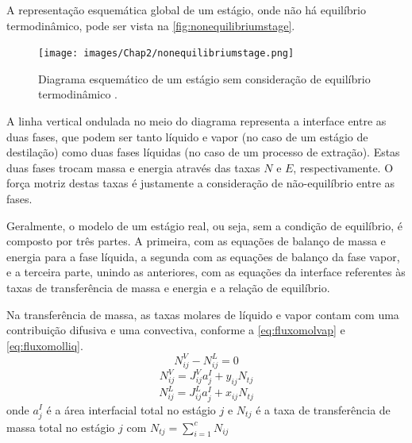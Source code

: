 \begin{enumerate}
A representação esquemática global de um estágio, onde não há equilíbrio termodinâmico, pode ser vista na
\autoref{fig:nonequilibriumstage}.
 \begin{figure}[htb]
 \centering \texttt{[image: images/Chap2/nonequilibriumstage.png]}
 \caption{Diagrama esquemático de um estágio sem consideração de equilíbrio termodinâmico \cite{Kooijman:1995a}.}
 \label{fig:nonequilibriumstage}
 \end{figure}
A linha vertical ondulada no meio do diagrama representa a interface entre as duas fases, que podem ser tanto líquido e
vapor (no caso de um estágio de destilação) como duas fases líquidas (no caso de
um processo de extração). Estas duas fases trocam massa e energia através das
taxas $N$ e $E$, respectivamente. O força motriz destas taxas é justamente a
consideração de não-equilíbrio entre as fases.

Geralmente, o modelo de um estágio real, ou seja, sem a condição de equilíbrio, é composto por três partes. A primeira,
com as equações de balanço de massa e energia para a fase líquida, a segunda com as equações de balanço da fase vapor,
e a terceira parte, unindo as anteriores, com as equações da interface referentes às taxas de transferência de massa
e energia e a relação de equilíbrio.

Na transferência de massa, as taxas molares de líquido e vapor contam com uma contribuição difusiva e uma convectiva,
conforme a \autoref{eq:fluxomolvap} e \ref{eq:fluxomolliq}. %
\begin{equation}
N^V_{ij} - N^L_{ij}= 0
\label{eq:equilfluxomol}
\end{equation}
\begin{equation}
N^V_{ij} = J^V_{ij}a_j^I + y_{ij}N_{tj}
\label{eq:fluxomolvap}
\end{equation}
\begin{equation}
N^L_{ij} = J^L_{ij}a_j^I + x_{ij}N_{tj}
\label{eq:fluxomolliq}
\end{equation}
onde $a^I_j$ é a área interfacial total no estágio $j$ e $N_{tj}$ é a taxa de
transferência de massa total no estágio $j$ com $N_{tj} =
\displaystyle\sum_{i=1}^c N_{ij}$


\end{enumerate}
